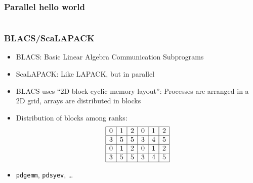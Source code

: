 \documentclass[usenames,dvipsnames,mathserif,compress]{beamer}
\begin{document}
\begin{frame}[fragile]
  \frametitle{Parallel hello world}
  
\end{frame}

\begin{frame}[fragile]
  \begin{columns}
    \begin{column}{1.05\textwidth}
  
    \end{column}
  \end{columns}
\end{frame}


\begin{frame}
  \frametitle{BLACS/ScaLAPACK}
  \begin{itemize}
  \item BLACS: Basic Linear Algebra Communication Subprograms
  \item ScaLAPACK: Like LAPACK, but in parallel
  \item BLACS uses ``2D block-cyclic memory layout'': Processes are arranged in a 2D grid, arrays are distributed in blocks
  \item Distribution of blocks among ranks:
    \begin{align}
      \begin{array}{|c|c|c|c|c|c|}
        \hline
          0 & 1 & 2 & 0 & 1 & 2\\\hline
          3 & 5 & 5 & 3 & 4 & 5\\\hline
          0 & 1 & 2 & 0 & 1 & 2\\\hline
          3 & 5 & 5 & 3 & 4 & 5\\\hline
        \end{array}\nonumber
    \end{align}
  \item \texttt{pdgemm}, \texttt{pdsyev}, \ldots
  \end{itemize}
\end{frame}
\end{document}
